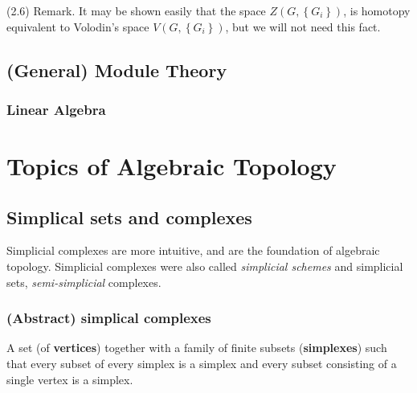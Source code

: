 \documentclass{book}
\begin{document}
(2.6) Remark. It may be shown easily that the space $Z\left(G,\left\{G_i\right\}\right)$, is homotopy equivalent to Volodin's space $V\left(G,\left\{G_i\right\}\right)$, but we will not need this fact.








\chapter{(General) Module Theory}

\section{Linear Algebra}









\part{Topics of Algebraic Topology}



\chapter{Simplical sets and complexes}
Simplicial complexes are more intuitive, and are the foundation of algebraic topology. Simplicial complexes were also called \textit{simplicial schemes} and simplicial sets, \textit{semi-simplicial} complexes. 

\section{(Abstract) simplical complexes}

A set (of \textbf{vertices}) together with a  family of finite subsets (\textbf{simplexes}) such that every subset of every simplex is a simplex and every subset consisting of a single vertex is a simplex.  
\end{document}
